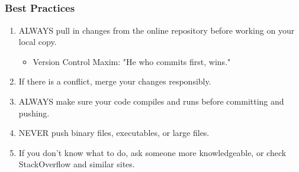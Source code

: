 \documentclass[]{beamer}
\begin{document}
\subsection{}
\begin{frame}[t]\frametitle{Best Practices}
  \begin{block}{}
    \begin{enumerate}
      \item ALWAYS pull in changes from the online repository before working on your local copy. 
        \begin{itemize}
          \item Version Control Maxim: "He who commits first, wins."
        \end{itemize}
      \item If there is a conflict, merge your changes responsibly.
      \item ALWAYS make sure your code compiles and runs before committing and pushing.
      \item NEVER push binary files, executables, or large files. 
      \item If you don't know what to do, ask someone more knowledgeable, or check StackOverflow and similar sites.
    \end{enumerate}
  \end{block}
\end{frame}
\end{document}
